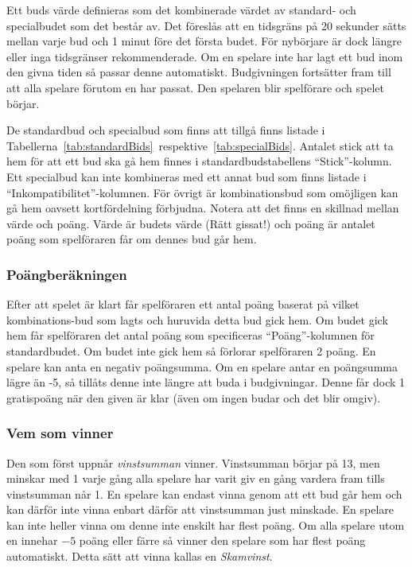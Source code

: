 \documentclass[a4paper]{article}
\begin{document}
				Ett buds värde definieras som det kombinerade värdet av standard- och specialbudet som det består av. Det föreslås att en tidsgräns på 20 sekunder sätts mellan varje bud och 1 minut före det första budet. För nybörjare är dock längre eller inga tidsgränser rekommenderade. Om en spelare inte har lagt ett bud inom den givna tiden så passar denne automatiskt. Budgivningen fortsätter fram till att alla spelare förutom en har passat. Den spelaren blir spelförare och spelet börjar.

				De standardbud och specialbud som finns att tillgå finns listade i Tabellerna~\ref{tab:standardBids}~respektive~\ref{tab:specialBids}. Antalet stick att ta hem för att ett bud ska gå hem finnes i standardbudstabellens ``Stick''-kolumn. Ett specialbud kan inte kombineras med ett annat bud som finns listade i ``Inkompatibilitet''-kolumnen. För övrigt är kombinationsbud som omöjligen kan gå hem oavsett kortfördelning förbjudna. Notera att det finns en skillnad mellan värde och poäng. Värde är budets värde (Rätt gissat!) och poäng är antalet poäng som spelföraren får om dennes bud går hem.

			\subsubsection{Poängberäkningen}
				Efter att spelet är klart får spelföraren ett antal poäng baserat på vilket kombinations-bud som lagts och huruvida detta bud gick hem. Om budet gick hem får spelföraren det antal poäng som specificeras ``Poäng''-kolumnen för standardbudet. Om budet inte gick hem så förlorar spelföraren 2 poäng. En spelare kan anta en negativ poängsumma. Om en spelare antar en poängsumma lägre än -5, så tillåts denne inte längre att buda i budgivningar. Denne får dock 1 gratispoäng när den given är klar (även om ingen budar och det blir omgiv).

			\subsubsection{Vem som vinner}
				\label{sec:winning}
				Den som först uppnår \emph{vinstsumman} vinner. Vinstsumman börjar på 13, men minskar med 1 varje gång alla spelare har varit giv en gång vardera fram tills vinstsumman når 1. En spelare kan endast vinna genom att ett bud går hem och kan därför inte vinna enbart därför att vinstsumman just minskade. En spelare kan inte heller vinna om denne inte enskilt har flest poäng. Om alla spelare utom en innehar $-5$ poäng eller färre så vinner den spelare som har flest poäng automatiskt. Detta sätt att vinna kallas en \emph{Skamvinst}.
\end{document}
